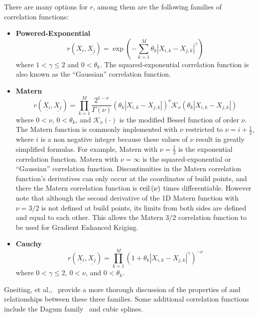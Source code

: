 \documentclass{article}
\begin{document}
There are many options for $r$, among them are the following 
families of correlation functions:
\begin{itemize}
\item {\bf Powered-Exponential}
      \begin{equation}
        r\left(\underline{X_i},\underline{X_j}\right)=\exp\left(-\sum_{k=1}^M \theta_k\left|X_{i,k}-X_{j,k}\right|^\gamma\right)
        \label{Eqn:PowExpCorrFunc}
      \end{equation}
      where $1<\gamma\le2$ and $0<\theta_k$.  The squared-exponential
      correlation function is also known as the ``Gaussian'' correlation 
      function.
\item {\bf Matern}
      \begin{displaymath}
        r\left(\underline{X_i},\underline{X_j}\right)=\prod_{k=1}^M \frac{2^{1-\nu}}{\Gamma(\nu)}\left(\theta_k\left|X_{i,k}-X_{j,k}\right|\right)^\nu\mathcal{K}_\nu\left(\theta_k\left|X_{i,k}-X_{j,k}\right|\right)
      \end{displaymath}
      where $0<\nu$, $0<\theta_k$, and $\mathcal{K}_\nu(\cdot)$ is the 
      modified Bessel function of order $\nu$. The Matern function is 
      commonly implemented with $\nu$ restricted to $\nu=i+\frac{1}{2}$, 
      where $i$ is a non negative integer because these values of $\nu$ 
      result in greatly simplified formulas.  For example, Matern with 
      $\nu=\frac{1}{2}$
      is the exponential correlation function.  Matern with $\nu=\infty$
      is the squared-exponential or ``Gaussian'' correlation function.
      Discontinuities in the Matern correlation function's derivatives can
      only occur at the coordinates of build points, and there the 
      Matern correlation function is ${\rm ceil}\left(\nu\right)$ 
      times differentiable.  However note that although the second derivative 
      of the 1D Matern function with $\nu=3/2$ is not defined at build points, 
      its limits from both sides are defined and equal to each other.  This
      allows the Matern $3/2$ correlation function to be used for Gradient 
      Enhanced Kriging.
\item {\bf Cauchy}
      \begin{displaymath}
        r\left(\underline{X_i},\underline{X_j}\right)=\prod_{k=1}^M \left(1+\theta_k\left|X_{i,k}-X_{j,k}\right|^\gamma\right)^{-\nu}
      \end{displaymath}
      where $0<\gamma\le2$, $0<\nu$, and $0<\theta_k$.
\end{itemize}
Gneiting, et al.,~\cite{gneiting2007geostatistical} provide a more 
thorough discussion of the properties of and relationships between these
three families.  Some additional correlation functions include the 
Dagum family~\cite{berg2008dagum} and cubic splines.\newline
\end{document}

